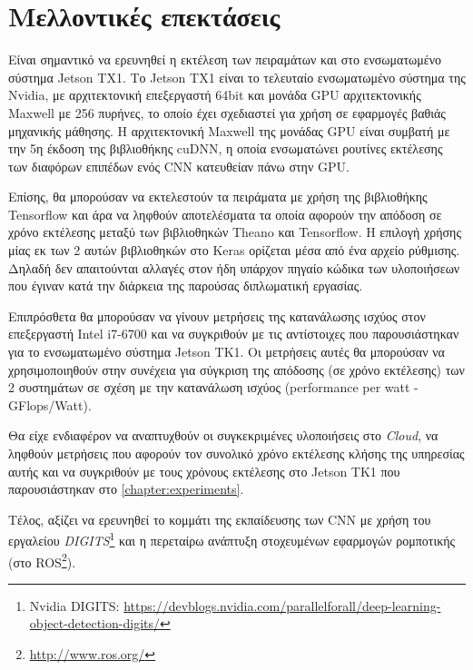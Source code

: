 \chapter{Μελλοντικές επεκτάσεις}
\label{chapter:future_work}

Είναι σημαντικό να ερευνηθεί η εκτέλεση των πειραμάτων και στο ενσωματωμένο σύστημα
Jetson TΧ1. Το Jetson TX1 είναι το τελευταίο ενσωματωμένο σύστημα της Nvidia,
με αρχιτεκτονική επεξεργαστή 64bit και μονάδα GPU αρχιτεκτονικής Maxwell με
256 πυρήνες, το οποίο έχει σχεδιαστεί για χρήση σε εφαρμογές βαθιάς
μηχανικής μάθησης. Η αρχιτεκτονική Maxwell της μονάδας GPU είναι συμβατή
με την 5η έκδοση της βιβλιοθήκης cuDNN, η οποία ενσωματώνει ρουτίνες
εκτέλεσης των διαφόρων επιπέδων ενός CNN κατευθείαν πάνω στην GPU.

Επίσης, θα μπορούσαν να εκτελεστούν τα πειράματα με χρήση της βιβλιοθήκης
Tensorflow και άρα να ληφθούν αποτελέσματα τα οποία αφορούν την απόδοση
σε χρόνο εκτέλεσης μεταξύ των βιβλιοθηκών Theano και Tensorflow.
Η επιλογή χρήσης μίας εκ των 2 αυτών βιβλιοθηκών στο Keras ορίζεται μέσα από
ένα αρχείο ρύθμισης. Δηλαδή δεν απαιτούνται αλλαγές στον ήδη υπάρχον πηγαίο κώδικα
των υλοποιήσεων που έγιναν κατά την διάρκεια της παρούσας διπλωματική εργασίας.

Επιπρόσθετα θα μπορούσαν να γίνουν μετρήσεις της κατανάλωσης ισχύος στον
επεξεργαστή Intel i7-6700 και να συγκριθούν με τις αντίστοιχες
που παρουσιάστηκαν για το ενσωματωμένο σύστημα Jetson TK1. Οι
μετρήσεις αυτές θα μπορούσαν να χρησιμοποιηθούν στην συνέχεια για σύγκριση
της απόδοσης (σε χρόνο εκτέλεσης) των 2 συστημάτων σε σχέση με την κατανάλωση
ισχύος (performance per watt - GFlops/Watt).

Θα είχε ενδιαφέρον να αναπτυχθούν οι συγκεκριμένες υλοποιήσεις στο \emph{Cloud},
να ληφθούν μετρήσεις που αφορούν τον συνολικό χρόνο εκτέλεσης κλήσης
της υπηρεσίας αυτής και να συγκριθούν με τους χρόνους εκτέλεσης στο Jetson TK1
που παρουσιάστηκαν στο \autoref{chapter:experiments}.


Τέλος, αξίζει να ερευνηθεί το κομμάτι της εκπαίδευσης των CNN
με χρήση του εργαλείου \emph{DIGITS}\footnote{Nvidia DIGITS: \url{https://devblogs.nvidia.com/parallelforall/deep-learning-object-detection-digits/}} και η περεταίρω ανάπτυξη στοχευμένων εφαρμογών ρομποτικής
(στο ROS\footnote{\url{http://www.ros.org/}}).

